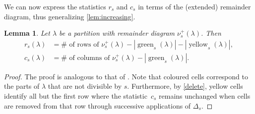 \documentclass[12pt,reqno]{amsart}
\numberwithin{equation}{section}
\newtheorem{lemma}[theorem]{Lemma}
\theoremstyle{definition}
\DeclareMathOperator{\gout}{green}
\DeclareMathOperator{\yout}{yellow}
\begin{document}
We can now express the statistics $r_s$ and $c_s$ in terms of the
(extended) remainder diagram, thus generalizing \cref{lem:increasing}.
\begin{lemma}\label{lem:statistics-remainder-diagram}
  Let $\lambda$ be a partition with remainder diagram
  $\nu^+_s(\lambda)$.  Then
  \begin{align*}
    r_s(\lambda) &= \# \text{ of rows of } \nu^+_s(\lambda)-|\gout_s(\lambda)|-|\yout_s(\lambda)|, \\
    c_s(\lambda) &= \# \text{ of columns of } \nu^+_s(\lambda)-|\gout_s(\lambda)|.
  \end{align*}
\end{lemma}
\begin{proof}
The proof is analogous to that of . Note that coloured cells correspond to the parts of $\lambda$ that are not divisible by $s$. 
Furthermore, by \cref{delete}, yellow cells identify all but the first row where the statistic~$c_s$ remains unchanged when cells are removed from that row through successive applications of $\Delta_s$.
\end{proof}
\end{document}
